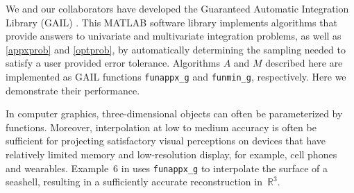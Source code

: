 \documentclass[review]{elsarticle}
\theoremstyle{definition}
\newcommand{\funappxg}{\texttt{funappx\_g}\xspace}
\newcommand{\funming}{\texttt{funmin\_g\xspace}}
\begin{document}
We and our collaborators have developed the Guaranteed Automatic Integration Library (GAIL) \cite{ChoEtal15a}.  This MATLAB software library implements algorithms that provide answers to univariate and multivariate integration problems, as well as \eqref{appxprob} and \eqref{optprob}, by automatically determining the sampling needed to satisfy a user provided error tolerance. Algorithms $A$ and $M$ described here are implemented as GAIL functions  \funappxg{} and \funming, respectively.  Here we demonstrate their performance.

In computer graphics, three-dimensional objects can often be parameterized by
functions. Moreover, interpolation at low to medium accuracy is often 
be sufficient for projecting satisfactory visual perceptions on devices that
have relatively limited memory and low-resolution display, for example,
cell phones and wearables. Example~6 in \cite[Chapter~3, Section~6]{Din15a} uses \funappxg{} to
interpolate the surface of a seashell, resulting in a sufficiently accurate
reconstruction in~$\mathbb{R}^3$.
\end{document}
